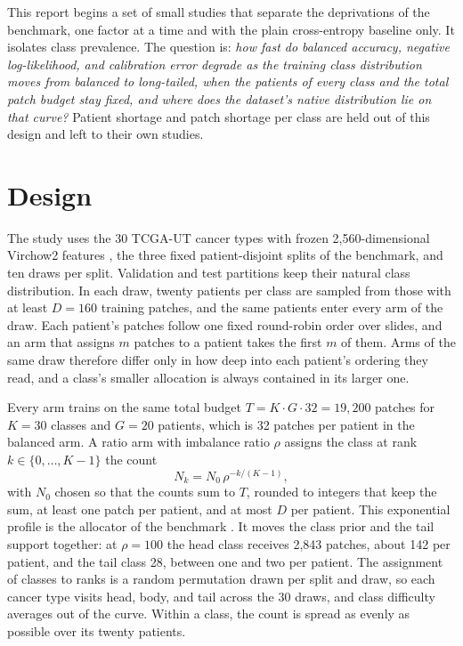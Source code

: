 \documentclass[11pt]{article}
\begin{document}
This report begins a set of small studies that separate the deprivations of the benchmark, one factor at a time and with the plain cross-entropy baseline only. It isolates class prevalence. The question is: \emph{how fast do balanced accuracy, negative log-likelihood, and calibration error degrade as the training class distribution moves from balanced to long-tailed, when the patients of every class and the total patch budget stay fixed, and where does the dataset's native distribution lie on that curve?} Patient shortage and patch shortage per class are held out of this design and left to their own studies.

\section{Design}
\label{sec:design}
The study uses the 30 TCGA-UT cancer types with frozen 2,560-dimensional Virchow2 features \citep{zimmermann2024virchow2}, the three fixed patient-disjoint splits of the benchmark, and ten draws per split. Validation and test partitions keep their natural class distribution. In each draw, twenty patients per class are sampled from those with at least $D=160$ training patches, and the same patients enter every arm of the draw. Each patient's patches follow one fixed round-robin order over slides, and an arm that assigns $m$ patches to a patient takes the first $m$ of them. Arms of the same draw therefore differ only in how deep into each patient's ordering they read, and a class's smaller allocation is always contained in its larger one.

Every arm trains on the same total budget $T=K\cdot G\cdot 32=19{,}200$ patches for $K=30$ classes and $G=20$ patients, which is 32 patches per patient in the balanced arm. A ratio arm with imbalance ratio $\rho$ assigns the class at rank $k\in\{0,\dots,K-1\}$ the count
\begin{equation}
  N_k = N_0\,\rho^{-k/(K-1)},
  \label{eq:profile}
\end{equation}
\noindent with $N_0$ chosen so that the counts sum to $T$, rounded to integers that keep the sum, at least one patch per patient, and at most $D$ per patient. This exponential profile is the allocator of the benchmark \citep{queisler2026benchmarkProtocol}. It moves the class prior and the tail support together: at $\rho=100$ the head class receives 2,843 patches, about 142 per patient, and the tail class 28, between one and two per patient. The assignment of classes to ranks is a random permutation drawn per split and draw, so each cancer type visits head, body, and tail across the 30 draws, and class difficulty averages out of the curve. Within a class, the count is spread as evenly as possible over its twenty patients.
\end{document}
